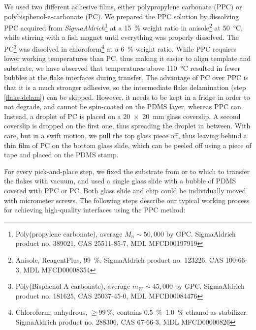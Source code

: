 We used two different adhesive films, either polypropylene carbonate (PPC) or polybisphenol-a-carbonate (PC).
%
We prepared the PPC solution by dissolving PPC acquired from \textit{SigmaAldrich}\footnote{Poly(propylene carbonate), average $M_n\sim50,000$ by GPC. SigmaAldrich product no. 389021, CAS 25511-85-7, MDL MFCD00197919} at a \SI{15}{\percent} weight ratio in anisole\footnote{Anisole, ReagentPlus\textsuperscript{\textregistered}, \SI{99}{\percent}. SigmaAldrich product no. 123226, CAS 100-66-3, MDL MFCD00008354} at \SI{50}{\celsius}, while stirring with a fish magnet until everything was properly dissolved.
%
The PC\footnote{Poly(Bisphenol A carbonate), average $m_W\sim 45,000$ by GPC. SigmaAldrich product no. 181625, CAS 25037-45-0, MDL MFCD00084476} was dissolved in chloroform\footnote{Chloroform, anhydrous, $\geq\SI{99}{\percent}$, contains \SIrange{0.5}{1.0}{\percent} ethanol as stabilizer. SigmaAldrich product no. 288306, CAS 67-66-3, MDL MFCD00000826} at a \SI{6}{\percent} weight ratio.
%
While PPC requires lower working temperatures than PC, thus making it easier to align template and substrate, we have observed that temperatures above \SI{110}{\celsius} resulted in fewer bubbles at the flake interfaces during transfer.
%
The advantage of PC over PPC is that it is a much stronger adhesive, so the intermediate flake delamination (step \ref{flake-delam}) can be skipped.
%
However, it needs to be kept in a fridge in order to not degrade, and cannot be spin-coated on the PDMS layer, whereas PPC can.
%
Instead, a droplet of PC is placed on a \SI{20x20}{\milli\meter} glass coverslip.
%
A second coverslip is dropped on the first one, thus spreading the droplet in between.
%
With care, but in a swift motion, we pull the top glass piece off, thus leaving behind a thin film of PC on the bottom glass slide, which can be peeled off using a piece of tape and placed on the PDMS stamp.

For every pick-and-place step, we fixed the substrate from or to which to transfer the flakes with vacuum, and used a single glass slide with a bubble of PDMS covered with PPC or PC.
%
Both glass slide and chip could be individually moved with micrometer screws.
%
The following steps describe our typical working process for achieving high-quality interfaces using the PPC method:

